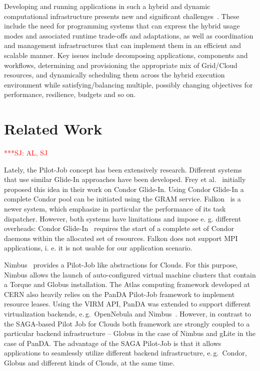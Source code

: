 \documentclass[conference,final]{IEEEtran}
\newcommand{\jhanote}[1]{ {\textcolor{red} { ***SJ: #1 }}}
\newcommand{\jhanote}[1]{}
\begin{document}
Developing and running applications in such a hybrid and dynamic
computational infrastructure presents new and significant
challenges~\cite{cloud-grid-autonomics}. These include the need for
programming systems that can express the hybrid usage modes and
associated runtime trade-offs and adaptations, as well as coordination
and management infrastructures that can implement them in an efficient
and scalable manner. Key issues include decomposing applications,
components and workflows, determining and provisioning the appropriate
mix of Grid/Cloud resources, and dynamically scheduling them across
the hybrid execution environment while satisfying/balancing multiple,
possibly changing objectives for performance, resilience, budgets and
so on.

\section{Related Work} \jhanote{AL, SJ}

Lately, the Pilot-Job concept has been extensively research.
Different systems that use similar Glide-In approaches have been
developed. Frey et al.~\cite{citeulike:291860} initially proposed this idea in their
work on Condor Glide-In. Using Condor Glide-In a complete Condor pool
can be initiated using the GRAM service. 
Falkon~\cite{1362680} is a newer system, 
which emphasize in particular the performance of its
task dispatcher. However, both systems have limitations and impose
e. g. different overheads: Condor Glide-In~\cite{citeulike:291860}
requires the start of a complete set of Condor daemons within the
allocated set of resources. Falkon does not support MPI applications,
i. e. it is not usable for our application scenario.

Nimbus~\cite{10.1109/MIC.2009.94} provides a Pilot-Job like
abstractions for Clouds. For this purpose, Nimbus allows the launch of
auto-configured virtual machine clusters that contain a Torque and
Globus installation.  The Atlas computing framework developed at CERN
also heavily relies on the PanDA Pilot-Job framework to implement
resource leases. Using the VIRM API, PanDA was extended to support
different virtualization backends, e.\,g.\ OpenNebula and
Nimbus~\cite{1555338}. However, in contrast to the SAGA-based Pilot
Job for Clouds both framework are strongly coupled to a particular
backend infrastructure -- Globus in the case of Nimbus and gLite in
the case of PanDA. The advantage of the SAGA Pilot-Job is that it
allows applications to seamlessly utilize different backend
infrastructure, e.\,g.\ Condor, Globus and different kinds of Clouds,
at the same time.
\end{document}
